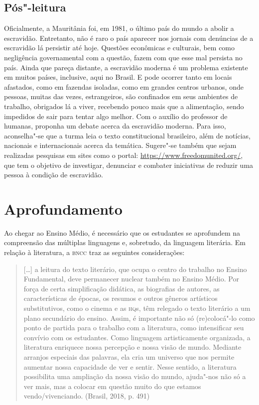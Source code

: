 \documentclass[12pt]{extarticle}
\begin{document}
\subsection{Pós"-leitura}

Oficialmente, a Mauritânia foi, em 1981, o último país do
mundo a abolir a escravidão. Entretanto, não é raro o país aparecer nos
jornais com denúncias de a escravidão lá persistir até hoje. Questões
econômicas e culturais, bem como negligência governamental com a
questão, fazem com que esse mal persista no país. Ainda que pareça
distante, a escravidão moderna é um problema existente em muitos países,
inclusive, aqui no Brasil. E pode ocorrer tanto em locais afastados,
como em fazendas isoladas, como em grandes centros urbanos, onde
pessoas, muitas das vezes, estrangeiros, são confinados em seus
ambientes de trabalho, obrigados lá a viver, recebendo pouco mais que a
alimentação, sendo impedidos de sair para tentar algo melhor. Com o
auxílio do professor de humanas, proponha um debate acerca da escravidão
moderna. Para isso, aconselha"-se que a turma leia o texto constitucional
brasileiro, além de notícias, nacionais e internacionais acerca da
temática. Sugere"-se também que sejam realizadas pesquisas em sites como
o portal:
\url{https://www.freedomunited.org/}, que tem o objetivo de investigar, denunciar e combater iniciativas de reduzir uma pessoa à condição de escravidão.

\section{Aprofundamento}

Ao chegar ao Ensino Médio, é necessário que os estudantes se aprofundem
na compreensão das múltiplas linguagens e, sobretudo, da linguagem
literária. Em relação à literatura, a \textsc{bncc} traz as seguintes
considerações:

\begin{quote}
{[}\ldots{}{]} a leitura do texto literário, que ocupa o centro do trabalho
no Ensino Fundamental, deve permanecer nuclear também no Ensino Médio.
Por força de certa simplificação didática, as biografias de autores, as
características de épocas, os resumos e outros gêneros artísticos
substitutivos, como o cinema e as \textsc{hq}s, têm relegado o texto literário a
um plano secundário do ensino. Assim, é importante não só (re)colocá"-lo
como ponto de partida para o trabalho com a literatura, como
intensificar seu convívio com os estudantes. Como linguagem
artisticamente organizada, a literatura enriquece nossa percepção e
nossa visão de mundo. Mediante arranjos especiais das palavras, ela cria
um universo que nos permite aumentar nossa capacidade de ver e sentir.
Nesse sentido, a literatura possibilita uma ampliação da nossa visão do
mundo, ajuda"-nos não só a ver mais, mas a colocar em questão muito do
que estamos vendo/vivenciando. (Brasil, 2018, p. 491)
\end{quote}
\end{document}
